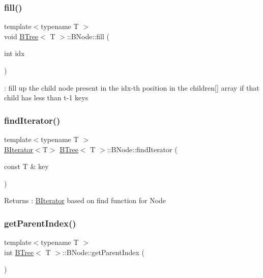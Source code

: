 \subsubsection{\texorpdfstring{fill()}{fill()}}
{\footnotesize\ttfamily template$<$typename T $>$ \\
void \hyperlink{classBTree}{B\+Tree}$<$ T $>$\+::B\+Node\+::fill (\begin{DoxyParamCaption}\item[{int}]{idx }\end{DoxyParamCaption})}

\+: fill up the child node present in the idx-\/th position in the children\mbox{[}\mbox{]} array if that child has less than t-\/1 keys \mbox{\label{classBTree_1_1BNode_a0a8c168d152ef320e62c0283c4db3f26}} 
\subsubsection{\texorpdfstring{find\+Iterator()}{findIterator()}}
{\footnotesize\ttfamily template$<$typename T $>$ \\
\hyperlink{classBIterator}{B\+Iterator}$<$T$>$ \hyperlink{classBTree}{B\+Tree}$<$ T $>$\+::B\+Node\+::find\+Iterator (\begin{DoxyParamCaption}\item[{const T \&}]{key }\end{DoxyParamCaption})}

\begin{DoxyReturn}{Returns}
\+: \hyperlink{classBIterator}{B\+Iterator} based on find function for Node 
\end{DoxyReturn}
\mbox{\label{classBTree_1_1BNode_a559e979d22e13c7b455fef771af47049}} 
\subsubsection{\texorpdfstring{get\+Parent\+Index()}{getParentIndex()}}
{\footnotesize\ttfamily template$<$typename T $>$ \\
int \hyperlink{classBTree}{B\+Tree}$<$ T $>$\+::B\+Node\+::get\+Parent\+Index (\begin{DoxyParamCaption}{ }\end{DoxyParamCaption})}

